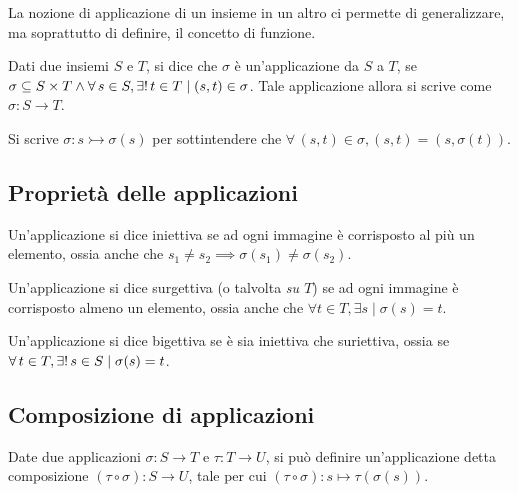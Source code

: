 La nozione di applicazione di un insieme in un altro ci permette
di generalizzare, ma soprattutto di definire, il concetto di
funzione.

\begin{definition}[Applicazione]
    Dati due insiemi $S$ e $T$, si dice che $\sigma$ è un'applicazione
    da $S$ a $T$, se $\sigma \subseteq S \times T \land \forall s \in S, \existsone
        t \in T \mid (s, t) \in \sigma$. Tale applicazione allora si scrive come
    $\sigma : S \to T$.
\end{definition}

Si scrive $\sigma : s \rightarrowtail \sigma(s)$ per sottintendere che
$\forall \, (s, t) \in \sigma, (s, t) = (s, \sigma(t))$.

\subsection{Proprietà delle applicazioni}

\begin{definition}[Iniettività]
    Un'applicazione si dice iniettiva se ad ogni immagine
    è corrisposto al più un elemento, ossia anche che
    $s_1 \neq s_2 \implies \sigma(s_1) \neq \sigma(s_2)$.
\end{definition}

\begin{definition}[Surgettività]
    Un'applicazione si dice surgettiva (o talvolta \textit{su $T$}) se ad ogni immagine
    è corrisposto almeno un elemento, ossia anche che
    $\forall t \in T, \exists s \mid \sigma(s) = t$.
\end{definition}

\begin{definition}[Bigettività]
    Un'applicazione si dice bigettiva se è sia iniettiva che
    suriettiva, ossia se $\forall t \in T, \existsone s \in S
        \mid \sigma(s) = t$.
\end{definition}

\subsection{Composizione di applicazioni}

\begin{definition}[Composizione]
    Date due applicazioni $\sigma : S \to T$ e
    $\tau : T \to U$, si può definire
    un'applicazione detta composizione
    $(\tau \circ \sigma) : S \to U$, tale per cui
    $(\tau \circ \sigma) : s \mapsto \tau(\sigma(s))$.
\end{definition}

